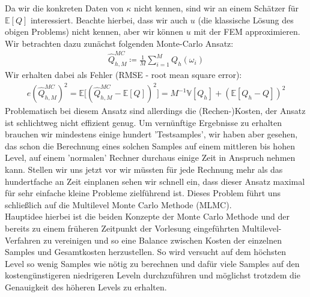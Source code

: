 Da wir die konkreten Daten von $\kappa$ nicht kennen, sind wir an einem Schätzer für $\mathbb{E}[Q]$ interessiert.
Beachte hierbei, dass wir auch $u$ (die klassische Lösung des obigen Problems) nicht kennen, aber wir können $u$ mit der FEM approximieren. \\
Wir betrachten dazu zunächst folgenden Monte-Carlo Ansatz:
\begin{align*}
	    \hat{Q}^{MC}_{h,M}  \coloneqq \frac{1}{M} \sum_{i= 1}^{M} Q_h (\omega_i)
\end{align*}
Wir erhalten dabei als Fehler (RMSE - root mean square error):
\begin{align*}
	e(\hat{Q}^{MC}_{h,M})^2 = \mathbb{E} \bigl[ (\hat{Q}^{MC}_{h,M} - \mathbb{E}[Q] )^2\bigr] = M^{-1} \mathbb{V}[ Q_h] + (\mathbb{E}[Q_h -Q])^2
\end{align*}
Problematisch bei diesem Ansatz sind allerdings die (Rechen-)Kosten, der Ansatz ist schlichtweg nicht effizient genug. Um vernünftige Ergebnisse zu erhalten brauchen wir mindestens einige hundert 'Testsamples', wir haben aber gesehen, das schon die Berechnung eines solchen Samples auf einem mittleren bis hohen Level, auf einem 'normalen' Rechner durchaus einige Zeit in Anspruch nehmen kann. Stellen wir uns jetzt vor wir müssten für jede Rechnung mehr als das hundertfache an Zeit einplanen sehen wir schnell ein, dass dieser Ansatz maximal für sehr einfache kleine Probleme zielführend ist.
Dieses Problem führt uns schließlich auf die Multilevel Monte Carlo Methode (MLMC). \\
Hauptidee hierbei ist die beiden Konzepte der Monte Carlo Methode und der bereits zu einem früheren Zeitpunkt der Vorlesung eingeführten Multilevel-Verfahren zu vereinigen und so eine Balance zwischen Kosten der einzelnen Samples und Gesamtkosten herzustellen.
So wird versucht auf dem höchsten Level so wenig Samples wie nötig zu berechnen und dafür viele Samples auf den kostengünstigeren niedrigeren Leveln durchzuführen und möglichst trotzdem die Genauigkeit des höheren Levels zu erhalten.

